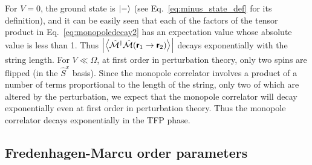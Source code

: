 \documentclass[twocolumn,superscriptaddress,amsmath,amssymb,aps,prx,nofootinbib]{revtex4-2}
\newcommand{\dual}[1]{\boldsymbol{\mathsf{#1}}}
\begin{document}
For $V=0$, the ground state is $\ket{-}$ (see Eq.~\eqref{eq:minus_state_def} for its definition), and it can be easily seen that each of the factors of the tensor product in Eq.~\eqref{eq:monopoledecay2} has an expectation value whose absolute value is less than 1.
Thus $\abs{\expval{\hat{\mathcal{M}}^\dagger \hat{\mathcal{M}} (\dual{r}_1\rightarrow \dual{r}_2)}}$ decays exponentially with the string length. For $V \ll \Omega$, at first order in perturbation theory, only two spins are flipped (in the $\hat{S}^x$ basis). Since the monopole correlator involves a product of a number of terms proportional to the length of the string, only two of which are altered by the perturbation, we expect that the monopole correlator will decay exponentially even at first order in perturbation theory. 
Thus the monopole correlator decays exponentially in the TFP phase. 

\subsection{Fredenhagen-Marcu order parameters} \label{sec:fm_order_param}
\end{document}
